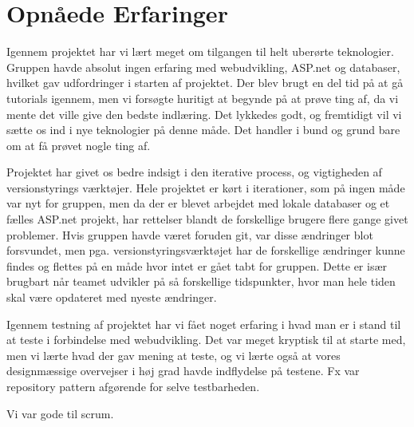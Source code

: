\chapter{Opnåede Erfaringer}

Igennem projektet har vi lært meget om tilgangen til helt uberørte teknologier. Gruppen havde absolut ingen erfaring med webudvikling, ASP.net og databaser, hvilket gav udfordringer i starten af projektet. Der blev brugt en del tid på at gå tutorials igennem, men vi forsøgte huritigt at begynde på at prøve ting af, da vi mente det ville give den bedste indlæring. Det lykkedes godt, og fremtidigt vil vi sætte os ind i nye teknologier på denne måde. Det handler i bund og grund bare om at få prøvet nogle ting af.  

Projektet har givet os bedre indsigt i den iterative process, og vigtigheden af versionstyrings værktøjer. Hele projektet er kørt i iterationer, som på ingen måde var nyt for gruppen, men da der er blevet arbejdet med lokale databaser og et fælles ASP.net projekt, har rettelser blandt de forskellige brugere flere gange givet problemer. Hvis gruppen havde været foruden git, var disse ændringer blot forsvundet, men pga. versionstyringsværktøjet har de forskellige ændringer kunne findes og flettes på en måde hvor intet er gået tabt for gruppen. Dette er især brugbart når teamet udvikler på så forskellige tidspunkter, hvor man hele tiden skal være opdateret med nyeste ændringer.

Igennem testning af projektet har vi fået noget erfaring i hvad man er i stand til at teste i forbindelse med webudvikling. Det var meget kryptisk til at starte med, men vi lærte hvad der gav mening at teste, og vi lærte også at vores designmæssige overvejser i høj grad havde indflydelse på testene. Fx var repository pattern afgørende for selve testbarheden.

Vi var gode til scrum. 
